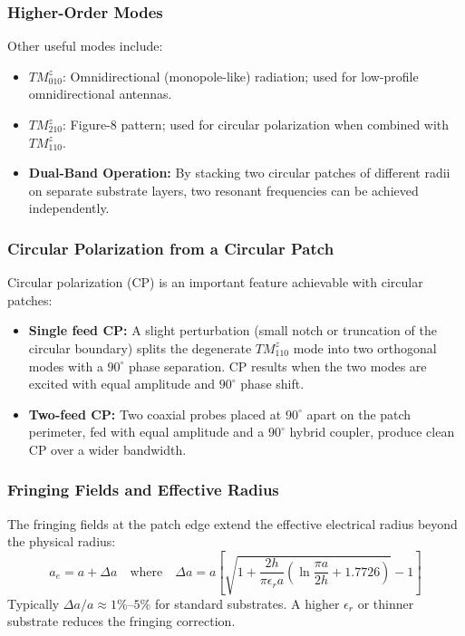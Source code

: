 \documentclass[12pt,a4paper]{article}
\begin{document}
\subsubsection*{Higher-Order Modes}
Other useful modes include:
\begin{itemize}[leftmargin=*, itemsep=3pt]
  \item $TM^z_{010}$: Omnidirectional (monopole-like) radiation; used for low-profile omnidirectional antennas.
  \item $TM^z_{210}$: Figure-8 pattern; used for circular polarization when combined with $TM^z_{110}$.
  \item \textbf{Dual-Band Operation:} By stacking two circular patches of different radii on separate substrate layers, two resonant frequencies can be achieved independently.
\end{itemize}

\subsubsection*{Circular Polarization from a Circular Patch}
Circular polarization (CP) is an important feature achievable with circular patches:
\begin{itemize}[leftmargin=*, itemsep=3pt]
  \item \textbf{Single feed CP:} A slight perturbation (small notch or truncation of the circular boundary) splits the degenerate $TM^z_{110}$ mode into two orthogonal modes with a $90^\circ$ phase separation. CP results when the two modes are excited with equal amplitude and $90^\circ$ phase shift.
  \item \textbf{Two-feed CP:} Two coaxial probes placed at $90^\circ$ apart on the patch perimeter, fed with equal amplitude and a $90^\circ$ hybrid coupler, produce clean CP over a wider bandwidth.
\end{itemize}

\subsubsection*{Fringing Fields and Effective Radius}
The fringing fields at the patch edge extend the effective electrical radius beyond the physical radius:
\[
a_e = a + \Delta a \quad \text{where} \quad \Delta a = a\left[\sqrt{1 + \frac{2h}{\pi\epsilon_r a}\left(\ln\frac{\pi a}{2h} + 1.7726\right)} - 1\right]
\]
Typically $\Delta a / a \approx 1\%$–$5\%$ for standard substrates. A higher $\epsilon_r$ or thinner substrate reduces the fringing correction.
\end{document}
